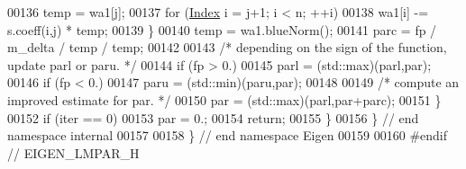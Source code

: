 \begin{DoxyCode}
00136         temp = wa1[j];
00137         \textcolor{keywordflow}{for} (\hyperlink{namespace_eigen_a62e77e0933482dafde8fe197d9a2cfde}{Index} i = j+1; i < n; ++i)
00138           wa1[i] -= s.coeff(i,j) * temp;
00139       \}
00140       temp = wa1.blueNorm();
00141       parc = fp / m\_delta / temp / temp;
00142 
00143       \textcolor{comment}{/* depending on the sign of the function, update parl or paru. */}
00144       \textcolor{keywordflow}{if} (fp > 0.)
00145         parl = (std::max)(parl,par);
00146       \textcolor{keywordflow}{if} (fp < 0.)
00147         paru = (std::min)(paru,par);
00148 
00149       \textcolor{comment}{/* compute an improved estimate for par. */}
00150       par = (std::max)(parl,par+parc);
00151     \}
00152     \textcolor{keywordflow}{if} (iter == 0)
00153       par = 0.;
00154     \textcolor{keywordflow}{return};
00155   \}
00156 \} \textcolor{comment}{// end namespace internal}
00157 
00158 \} \textcolor{comment}{// end namespace Eigen}
00159 
00160 \textcolor{preprocessor}{#endif // EIGEN\_LMPAR\_H}
\end{DoxyCode}
